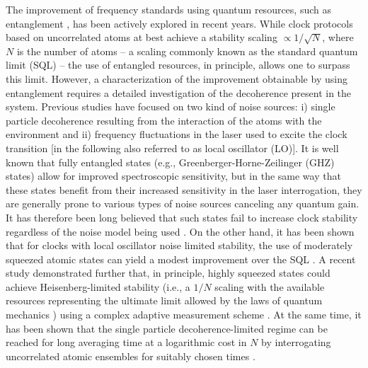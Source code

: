 The improvement of frequency standards using quantum resources, such as
entanglement \cite{Buzek1999, Andre2004,LouchetChauvet:2010fs,Rosenband2012_numerical,
Borregaard2013_nearHeisenberg},
has been actively explored in recent years. While clock protocols
based on uncorrelated atoms at best achieve a stability scaling
$\propto1/\sqrt{N}$, where $N$ is the number of atoms -- a
scaling commonly known as the standard quantum limit (SQL) \cite{Caves1980} --
the use of entangled resources, in principle, allows one to surpass this limit.
However, a characterization of the improvement obtainable by using entanglement
 requires a detailed investigation of the decoherence present in the system.
 Previous studies have focused on two kind of noise sources: i) single particle
 decoherence resulting from the interaction of the atoms with the environment
 and ii) frequency fluctuations in the laser used to excite the clock transition
 [in the following also referred to as local oscillator (LO)].
  It is well known that fully entangled states (e.g.,
  Greenberger-Horne-Zeilinger (GHZ) states) allow for improved spectroscopic sensitivity, but in the same way
 that these states benefit from their increased sensitivity in the laser
 interrogation, they are generally prone to various types of noise sources
 canceling any quantum gain. It has therefore been long believed that such
 states fail to increase clock stability regardless of the noise model being used
 \cite{Bollinger1996, Wineland1998, Rosenband2012_numerical,Huelga1997}. On the other hand, it has been shown that
for clocks with local oscillator noise limited stability, the use of
moderately squeezed atomic states can yield a modest improvement over the SQL
\cite{Andre2004,LouchetChauvet:2010fs}.
 A recent study demonstrated further that, in principle, highly squeezed states
could achieve Heisenberg-limited stability (i.e., a $1/N$ scaling
with the available resources representing the ultimate limit allowed by the laws
of quantum mechanics \cite{Giovanetti2011}) using a complex adaptive
measurement scheme \cite{Borregaard2013_nearHeisenberg}.
 At the same time, it has been shown that the single particle
 decoherence-limited regime can be reached for long averaging time at
a logarithmic cost in $N$ by interrogating uncorrelated atomic
ensembles for suitably chosen times \cite{Rosenband2013, Borregaard2013}.

